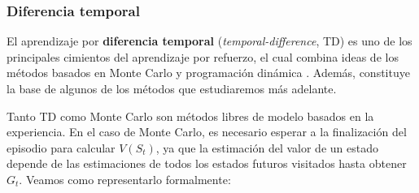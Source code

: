 \subsubsection{Diferencia temporal}

El aprendizaje por \textbf{diferencia temporal} (\textit{temporal-difference}, TD) es uno de los principales cimientos del aprendizaje por refuerzo, el cual combina ideas de los métodos basados en Monte Carlo y programación dinámica \cite{sutton2018reinforcement}. Además, constituye la base de algunos de los métodos que estudiaremos más adelante.

Tanto TD como Monte Carlo son métodos libres de modelo basados en la experiencia. En el caso de Monte Carlo, es necesario esperar a la finalización del episodio para calcular $V(S_t)$, ya que la estimación del valor de un estado depende de las estimaciones de todos los estados futuros visitados hasta obtener $G_t$. Veamos como representarlo formalmente:

